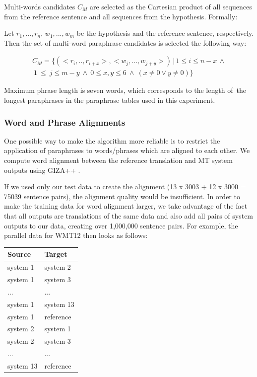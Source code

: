 Multi-words candidates $ C_M $ are selected as the Cartesian product of all sequences
from the reference sentence and all sequences from the hypothesis. Formally:

Let $ r_1,..., r_n $, $ w_1,...,w_m $ be the hypothesis and the reference sentence,
respectively. Then the set of multi-word paraphrase candidates is selected the following
way:

\begin{align*}
  C_{M} = \{ (<r_i,..,r_{i+x}>,<w_j,...,w_{j+y}>) \, | \, 1 \leq i \leq n-x \, \wedge \\ 
    \: 1~\leq~j \leq m-y  \: \wedge \: 0 \leq x,y \leq 6 \: \wedge \: (x \neq 0 \vee y \neq 0) \}
  \end{align*}

Maximum phrase length is seven words, which corresponds to the length of~the 
longest paraphrases in the paraphrase tables used in this experiment.

\subsubsection{Word and Phrase Alignments}

One possible way to make the algorithm more reliable is to restrict the
application of paraphrases to words/phrases which are aligned to each other. 
We compute word alignment between the reference translation and MT system
outputs using GIZA++ \citep{gizapp}.

If we used only our test data to create the alignment (13 x 3003 + 12 x 3000 
= 75039 sentence pairs), the alignment quality would be insufficient. In order 
to make the training data for word alignment larger, we take advantage of the 
fact that all outputs are translations of the same data and also add all pairs 
of system outputs to our data, creating over 1,000,000  sentence
pairs. For example, the parallel data for WMT12 then looks as follows:

\begin{center}
\begin{tabular}{ll}
Source & Target \\
\hline
system 1 & system 2 \\
system 1 & system 3 \\
... & ...\\
system 1 & system 13 \\
system 1 & reference \\
system 2 & system 1 \\
system 2 & system 3 \\
... & ... \\
system 13 & reference \\
\end{tabular}
\end{center}

